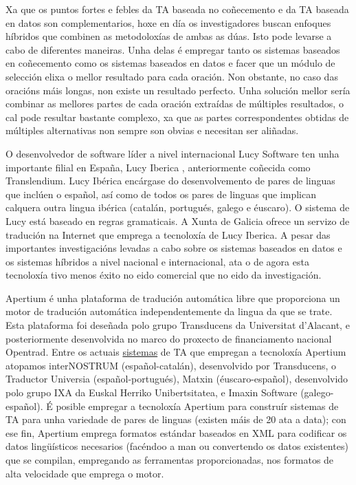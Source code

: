 \begin{multicols}{2}
Xa que os puntos fortes e febles da TA baseada no coñecemento e da TA baseada en datos son complementarios, hoxe en día os investigadores buscan enfoques híbridos que combinen as metodoloxías de ambas as dúas. Isto pode levarse a cabo de diferentes maneiras. Unha delas é empregar tanto os sistemas baseados en coñecemento como os sistemas baseados en datos e facer que un módulo de selección elixa o mellor resultado para cada oración. Non obstante, no caso das oracións máis longas, non existe un resultado perfecto. Unha solución mellor sería combinar as mellores partes de cada oración extraídas de múltiples resultados, o cal pode resultar bastante complexo, xa que as partes correspondentes obtidas de múltiples alternativas non sempre son obvias e necesitan ser aliñadas. 

O desenvolvedor de software líder a nivel internacional Lucy Software ten unha importante filial en España, Lucy Iberica \cite{GAL-Nota31}, anteriormente coñecida como Translendium. Lucy Ibérica encárgase do desenvolvemento de pares de linguas que inclúen o español, así como de todos os pares de linguas que implican calquera outra lingua ibérica (catalán, portugués, galego e éuscaro). O sistema de Lucy está baseado en regras gramaticais. A Xunta de Galicia \cite{GAL-Nota32} ofrece un servizo de tradución na Internet que emprega a tecnoloxía de Lucy Iberica. A pesar das importantes investigacións levadas a cabo sobre os sistemas baseados en datos e os sistemas híbridos a nivel nacional e internacional, ata o de agora esta tecnoloxía tivo menos éxito no eido comercial que no eido da investigación.

Apertium é unha plataforma de tradución automática libre que proporciona un motor de tradución automática independentemente da lingua da que se trate. Esta plataforma foi deseñada polo grupo Transducens da Universitat d'Alacant, e posteriormente desenvolvida no marco do proxecto de financiamento nacional Opentrad. Entre os actuais \uline{sistemas} de TA que empregan a tecnoloxía Apertium atopamos interNOSTRUM (español-catalán), desenvolvido por Transducens, o Traductor Universia (español-portugués), Matxin (éuscaro-español), desenvolvido polo grupo IXA \cite{GAL-Nota33} da Euskal Herriko Unibertsitatea, e Imaxin Software (galego-español). É posible empregar a tecnoloxía Apertium para construír sistemas de TA para unha variedade de pares de linguas (existen máis de 20 ata a data); con ese fin, Apertium emprega formatos estándar baseados en XML para codificar os datos lingüísticos necesarios (facéndoo a man ou convertendo os datos existentes) que se compilan, empregando as ferramentas proporcionadas, nos formatos de alta velocidade que emprega o motor. 


\end{multicols}
